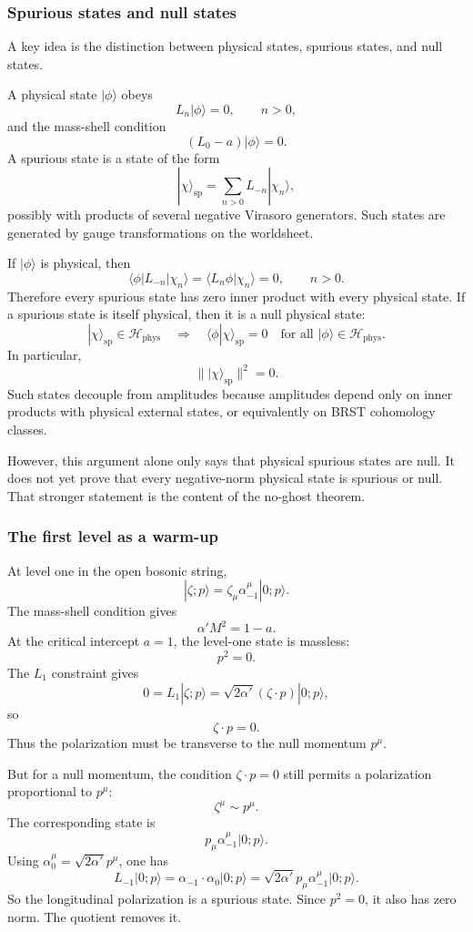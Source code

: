 \documentclass[
  10pt,
  a4paper,
  openany]{book}
\begin{document}
\subsubsection{Spurious states and null
states}\label{spurious-states-and-null-states}

A key idea is the distinction between physical states, spurious states,
and null states.

A physical state \(|\phi\rangle\) obeys \[
L_n|\phi\rangle=0,
\qquad
n>0,
\] and the mass-shell condition \[
(L_0-a)|\phi\rangle=0.
\] A spurious state is a state of the form \[
|\chi\rangle_{\text{sp}}
=
\sum_{n>0}L_{-n}|\chi_n\rangle,
\] possibly with products of several negative Virasoro generators. Such
states are generated by gauge transformations on the worldsheet.

If \(|\phi\rangle\) is physical, then \[
\langle \phi|L_{-n}|\chi_n\rangle
=
\langle L_n\phi|\chi_n\rangle
=
0,
\qquad
n>0.
\] Therefore every spurious state has zero inner product with every
physical state. If a spurious state is itself physical, then it is a
null physical state: \[
|\chi\rangle_{\text{sp}}\in\mathcal H_{\text{phys}}
\quad
\Longrightarrow
\quad
\langle \phi|\chi\rangle_{\text{sp}}=0
\quad
\text{for all }|\phi\rangle\in\mathcal H_{\text{phys}}.
\] In particular, \[
\| |\chi\rangle_{\text{sp}}\|^2=0.
\] Such states decouple from amplitudes because amplitudes depend only
on inner products with physical external states, or equivalently on BRST
cohomology classes.

However, this argument alone only says that physical spurious states are
null. It does not yet prove that every negative-norm physical state is
spurious or null. That stronger statement is the content of the no-ghost
theorem.

\subsubsection{The first level as a
warm-up}\label{the-first-level-as-a-warm-up}

At level one in the open bosonic string, \[
|\zeta;p\rangle
=
\zeta_\mu\alpha_{-1}^\mu|0;p\rangle.
\] The mass-shell condition gives \[
\alpha' M^2
=
1-a.
\] At the critical intercept \(a=1\), the level-one state is massless:
\[
p^2=0.
\] The \(L_1\) constraint gives \[
0
=
L_1|\zeta;p\rangle
=
\sqrt{2\alpha'}(\zeta\cdot p)|0;p\rangle,
\] so \[
\zeta\cdot p=0.
\] Thus the polarization must be transverse to the null momentum
\(p^\mu\).

But for a null momentum, the condition \(\zeta\cdot p=0\) still permits
a polarization proportional to \(p^\mu\): \[
\zeta^\mu\sim p^\mu.
\] The corresponding state is \[
p_\mu\alpha_{-1}^\mu|0;p\rangle.
\] Using \(\alpha_0^\mu=\sqrt{2\alpha'}p^\mu\), one has \[
L_{-1}|0;p\rangle
=
\alpha_{-1}\cdot\alpha_0|0;p\rangle
=
\sqrt{2\alpha'}p_\mu\alpha_{-1}^\mu|0;p\rangle.
\] So the longitudinal polarization is a spurious state. Since
\(p^2=0\), it also has zero norm. The quotient removes it.
\end{document}
